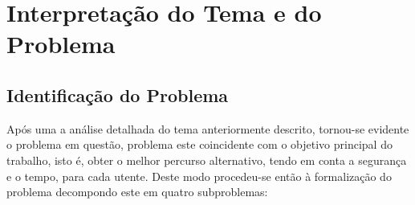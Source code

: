 \documentclass[relatorio.tex]{subfiles}
\begin{document}
\section[Interpretação do Problema]{Interpretação do Tema e do Problema}
\label{sec:problem}

\subsection{Identificação do Problema}
\label{subsec:identproblem}

Após uma a análise detalhada do tema anteriormente descrito,
tornou-se evidente o problema em questão, problema este coincidente
com o objetivo principal do trabalho, isto é, obter o melhor percurso
alternativo, tendo em conta a segurança e o tempo, para cada utente.
Deste modo procedeu-se então à formalização do problema decompondo
este em quatro subproblemas:
\end{document}

